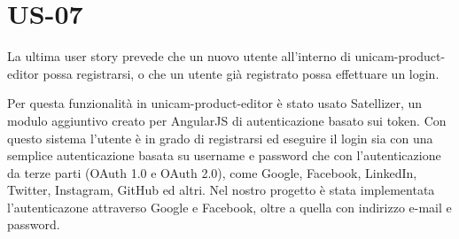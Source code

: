\section{US-07}
La ultima user story prevede che un nuovo utente all'interno di unicam-product-editor possa registrarsi, o che un utente già registrato possa effettuare un login.

Per questa funzionalità in unicam-product-editor è stato usato Satellizer, un modulo aggiuntivo creato per AngularJS di autenticazione basato sui token. Con questo sistema l'utente è in grado di registrarsi ed eseguire il login sia con una semplice autenticazione basata su username e password che con l'autenticazione da terze parti (OAuth 1.0 e OAuth 2.0), come Google, Facebook, LinkedIn, Twitter, Instagram, GitHub ed altri. Nel nostro progetto è stata implementata l'autenticazone attraverso Google e Facebook, oltre a quella con indirizzo e-mail e password.

